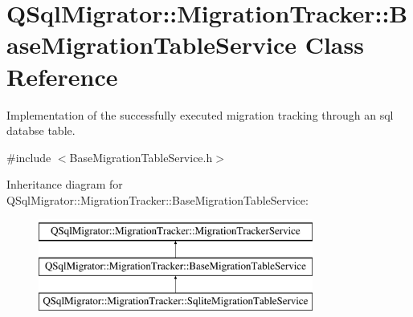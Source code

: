 \hypertarget{class_q_sql_migrator_1_1_migration_tracker_1_1_base_migration_table_service}{}\section{Q\+Sql\+Migrator\+:\+:Migration\+Tracker\+:\+:Base\+Migration\+Table\+Service Class Reference}
\label{class_q_sql_migrator_1_1_migration_tracker_1_1_base_migration_table_service}


Implementation of the successfully executed migration tracking through an sql databse table.  




{\ttfamily \#include $<$Base\+Migration\+Table\+Service.\+h$>$}

Inheritance diagram for Q\+Sql\+Migrator\+:\+:Migration\+Tracker\+:\+:Base\+Migration\+Table\+Service\+:\begin{figure}[H]
\begin{center}
\leavevmode
\includegraphics[height=3.000000cm]{class_q_sql_migrator_1_1_migration_tracker_1_1_base_migration_table_service}
\end{center}
\end{figure}
